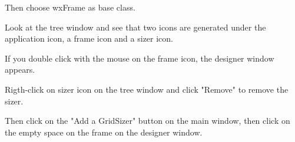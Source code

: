 \documentclass[a4paper,10pt]{book}
\begin{document}
                                                    
                                                    
                                                    
                                                    Then choose wxFrame as base class.
                                                    
                                                    
                                                    
                                                    
                                                    Look at the tree window and see that two icons are generated
                                                     under the application icon, a frame icon and a sizer icon.
                                                    
                                                    
                                                    
                                                    
                                                    
                                                    If you double click with the mouse on the frame icon, the designer
                                                     window appears. 
                                                    
                                                    
                                                    
                                                    
                                                    Rigth-click on sizer icon on the tree window and click "Remove"
                                                     to remove the sizer.
                                                    
                                                    
                                                    
                                                    
                                                    Then click on the "Add a GridSizer" button on the main window,
                                                     then click on the empty space on the frame on the designer window.
                                                    
                                                    
                                                    
\end{document}
